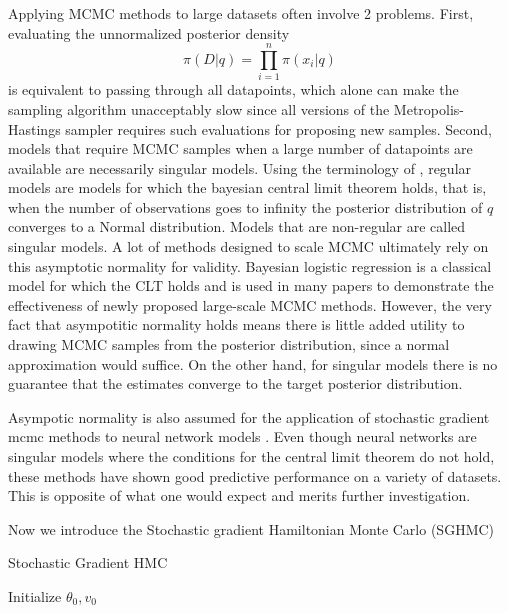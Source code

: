 \documentclass[12pt]{report}
\begin{document}
Applying MCMC methods to large datasets often involve 2 problems. First, evaluating the unnormalized posterior density
\[ \pi(D|q) = \prod_{i=1}^n \pi(x_i|q) \]
 is equivalent to passing through all datapoints, which alone can make the sampling algorithm unacceptably slow since all versions of the Metropolis-Hastings sampler requires such evaluations for proposing new samples. Second, models that require MCMC samples when a large number of datapoints are available are necessarily singular models. Using the terminology of \cite{watanabe2009algebraic}, regular models are models for which the bayesian central limit theorem \cite{le2012asymptotic} holds, that is, when the number of observations goes to infinity the posterior distribution of $q$ converges to a Normal distribution. Models that are non-regular are called singular models. A lot of methods designed to scale MCMC \cite{neiswanger2013asymptotically,scott2016bayes,} ultimately rely on this asymptotic normality for validity. Bayesian logistic regression is a classical model for which the CLT holds and is used in many papers to demonstrate the effectiveness of newly proposed large-scale MCMC methods. However, the very fact that asympotitic normality holds means there is little added utility to drawing MCMC samples from the posterior distribution, since a normal approximation would suffice. On the other hand, for singular models there is no guarantee that the estimates converge to the target posterior distribution. 

Asympotic normality is also assumed for the application of stochastic gradient mcmc methods to neural network models \cite{welling2011bayesian,chen2014stochastic,ahn2012bayesian,ding2014bayesian,ma2015complete}. Even though neural networks are singular models where the conditions for the central limit theorem do not hold, these methods have shown good predictive performance on a variety of datasets. This is opposite of what one would expect and merits further investigation.


Now we introduce the Stochastic gradient Hamiltonian Monte Carlo (SGHMC) \cite{chen2014stochastic}


\begin{algorithm}
    \caption{Stochastic Gradient HMC}
        Initialize $\theta_0,v_0$ \;
\end{algorithm}
\end{document}
